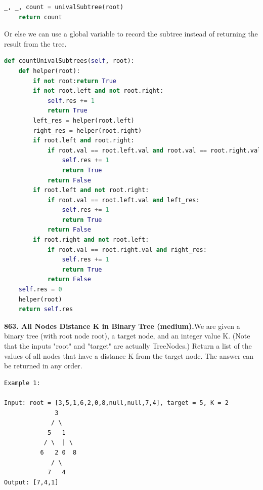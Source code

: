 \documentclass[../main.tex]{subfiles}
\begin{document}
\begin{examples}[resume]
\begin{lstlisting}[language = Python]
    _, _, count = univalSubtree(root)
    return count
\end{lstlisting}
Or else we can use a global variable to record the subtree instead of returning the result from the tree.
\begin{lstlisting}[language=Python]
def countUnivalSubtrees(self, root):
    def helper(root):
        if not root:return True
        if not root.left and not root.right:
            self.res += 1
            return True
        left_res = helper(root.left)
        right_res = helper(root.right)
        if root.left and root.right:    
            if root.val == root.left.val and root.val == root.right.val and left_res and right_res:
                self.res += 1
                return True
            return False
        if root.left and not root.right:
            if root.val == root.left.val and left_res:
                self.res += 1
                return True
            return False
        if root.right and not root.left:
            if root.val == root.right.val and right_res:
                self.res += 1
                return True
            return False
    self.res = 0
    helper(root)
    return self.res
\end{lstlisting}
\item \textbf{863. All Nodes Distance K in Binary Tree (medium).}We are given a binary tree (with root node root), a target node, and an integer value K. (Note that the inputs "root" and "target" are actually TreeNodes.) Return a list of the values of all nodes that have a distance K from the target node.  The answer can be returned in any order.
\begin{lstlisting}[numbers=none]
Example 1:

Input: root = [3,5,1,6,2,0,8,null,null,7,4], target = 5, K = 2
              3
             / \
            5   1
           / \  | \
          6   2 0  8
             / \
            7   4
Output: [7,4,1]


\end{lstlisting}
\end{examples}
\end{document}
